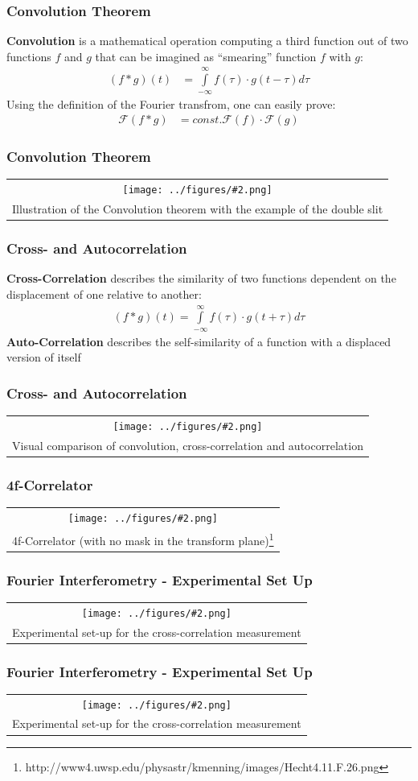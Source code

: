 \documentclass{beamer}
\newcommand{\gra}[3][]{
	\begin{table}
	\centering
	\begin{tabular}[width=\textwidth]{c}
		\texttt{[image: ../figures/\#2.png]}\\
		\small #3
	\end{tabular}
	\end{table}
}
\begin{document}
\begin{frame}
	\frametitle{Convolution Theorem}
	\textbf{Convolution} is a mathematical operation computing a third function out of two functions $f$ and $g$ that can be imagined as ``smearing'' function $f$ with $g$:
	\begin{align}
	(f*g)(t)&=\int\limits_{-\infty}^{\infty} f(\tau)\cdot g(t-\tau) d\tau
	\end{align}
	Using the definition of the Fourier transfrom, one can easily prove:
	\begin{align}
	\mathscr{F}(f*g)&=const. \mathscr{F}(f)\cdot \mathscr{F}(g)
	\end{align}
\end{frame}
\begin{frame}
	\frametitle{Convolution Theorem}
	\gra[0.65]{Convolution}{Illustration of the Convolution theorem with the example of the double slit\footnotemark}
\end{frame}
\begin{frame}
	\frametitle{Cross- and Autocorrelation}
\textbf{Cross-Correlation} describes the similarity of two functions dependent on the displacement of one relative to another:
	\begin{align}
	(f*g)(t)=\int\limits_{-\infty}^{\infty} f(\tau)\cdot g(t+\tau) d\tau \label{corr}
	\end{align}
\textbf{Auto-Correlation} describes the self-similarity of a function with a displaced version of itself
\end{frame}
\begin{frame}
	\frametitle{Cross- and Autocorrelation}
	\gra[0.65]{correlation}{Visual comparison of convolution, cross-correlation and autocorrelation  \footnotemark} 
\end{frame}
\begin{frame}
	\frametitle{4f-Correlator}
	\gra[0.8]{Correlator}{4f-Correlator (with no mask in the transform plane)\footnote{http://www4.uwsp.edu/physastr/kmenning/images/Hecht4.11.F.26.png}} 
\end{frame}
\begin{frame}
	\frametitle{Fourier Interferometry - Experimental Set Up}
   \gra[0.72]{Versuchsaufbau_4}{Experimental set-up for the cross-correlation measurement  \footfullcite{Bamberger}}
\end{frame}
\begin{frame}
	\frametitle{Fourier Interferometry - Experimental Set Up}
	\gra[0.8]{aufbau4}{Experimental set-up for the cross-correlation measurement}
\end{frame}
\end{document}

